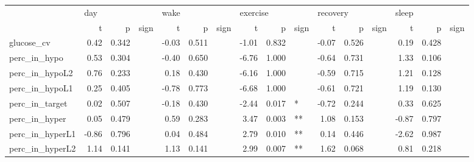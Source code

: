 \begin{tabular}{lrrlrrlrrlrrlrrl}
\toprule
{} & \multicolumn{3}{l}{day} & \multicolumn{3}{l}{wake} & \multicolumn{3}{l}{exercise} & \multicolumn{3}{l}{recovery} & \multicolumn{3}{l}{sleep} \\
{} &     t &      p & sign &     t &      p & sign &        t &      p & sign &        t &      p & sign &     t &      p & sign \\
\midrule
glucose_cv      &  0.42 &  0.342 &      & -0.03 &  0.511 &      &    -1.01 &  0.832 &      &    -0.07 &  0.526 &      &  0.19 &  0.428 &      \\
perc_in_hypo    &  0.53 &  0.304 &      & -0.40 &  0.650 &      &    -6.76 &  1.000 &      &    -0.64 &  0.731 &      &  1.33 &  0.106 &      \\
perc_in_hypoL2  &  0.76 &  0.233 &      &  0.18 &  0.430 &      &    -6.16 &  1.000 &      &    -0.59 &  0.715 &      &  1.21 &  0.128 &      \\
perc_in_hypoL1  &  0.25 &  0.405 &      & -0.78 &  0.773 &      &    -6.68 &  1.000 &      &    -0.61 &  0.721 &      &  1.19 &  0.130 &      \\
perc_in_target  &  0.02 &  0.507 &      & -0.18 &  0.430 &      &    -2.44 &  0.017 &    * &    -0.72 &  0.244 &      &  0.33 &  0.625 &      \\
perc_in_hyper   &  0.05 &  0.479 &      &  0.59 &  0.283 &      &     3.47 &  0.003 &   ** &     1.08 &  0.153 &      & -0.87 &  0.797 &      \\
perc_in_hyperL1 & -0.86 &  0.796 &      &  0.04 &  0.484 &      &     2.79 &  0.010 &   ** &     0.14 &  0.446 &      & -2.62 &  0.987 &      \\
perc_in_hyperL2 &  1.14 &  0.141 &      &  1.13 &  0.141 &      &     2.99 &  0.007 &   ** &     1.62 &  0.068 &      &  0.81 &  0.218 &      \\
\bottomrule
\end{tabular}
